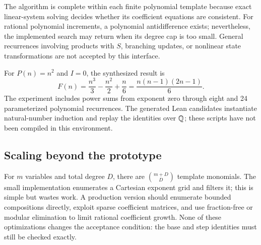 The algorithm is complete within each finite polynomial template because exact linear-system solving decides whether its coefficient equations are consistent. For rational polynomial increments, a polynomial antidifference exists; nevertheless, the implemented search may return \unknown{} when its degree cap is too small. General recurrences involving products with $S$, branching updates, or nonlinear state transformations are not accepted by this interface.

For $P(n)=n^2$ and $I=0$, the synthesized result is
\[
 F(n)=\frac{n^3}{3}-\frac{n^2}{2}+\frac n6
     =\frac{n(n-1)(2n-1)}6.
\]
The experiment includes power sums from exponent zero through eight and 24 parameterized polynomial recurrences. The generated Lean candidates instantiate natural-number induction and replay the identities over $\mathbb{Q}$; these scripts have not been compiled in this environment.

\subsection{Scaling beyond the prototype}

For $m$ variables and total degree $D$, there are $\binom{m+D}{D}$ template monomials. The small implementation enumerates a Cartesian exponent grid and filters it; this is simple but wastes work. A production version should enumerate bounded compositions directly, exploit sparse coefficient matrices, and use fraction-free or modular elimination to limit rational coefficient growth. None of these optimizations changes the acceptance condition: the base and step identities must still be checked exactly.
